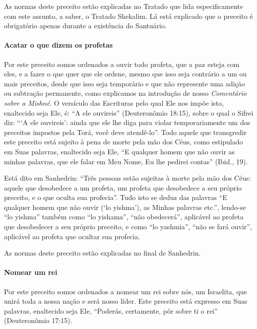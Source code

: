 As normas deste preceito estão explicadas no Tratado que lida
especificamente com este assunto, a saber, o Tratado Shekalim. Lá está
explicado que o preceito é obrigatório apenas durante a existência do
Santuário.

\paragraph{Acatar o que dizem os profetas}

Por este preceito somos ordenados a ouvir todo profeta, que a paz esteja
com eles, e a fazer o que quer que ele ordene, mesmo que isso seja contrário a um ou mais preceitos, desde que isso seja temporário e que não
represente uma adição ou subtração permanente, como explicamos na
introdução de nosso \emph{Comentário sobre a Mishné}. O versículo das
Escrituras pelo qual Ele nos impõe isto, enaltecido seja Ele, é: ``A ele
ouvireis'' (Deuteronômio 18:15), sobre o qual o Sifrei diz: ```A ele
ouvireis': ainda que ele lhe diga para violar temporariamente um dos
preceitos impostos pela Torá, você deve atendê-lo''. Todo aquele que
transgredir este preceito está sujeito à pena de morte pela mão dos
Céus, como estipulado em Suas palavras, enaltecido seja Ele, ``E
qualquer homem que não ouvir as minhas palavras, que ele falar em Meu
Nome, Eu lhe pedirei contas'' (Ibid., 19).

Está dito em Sanhedrin: ``Três pessoas estão sujeitas à morte pela mão
dos Céus: aquele que desobedece a um profeta, um profeta que desobedece
a seu próprio preceito, e o que oculta sua profecia''. Tudo isto se
deduz das palavras ``E qualquer homem que não ouvir (`lo yishma'), as
Minhas palavras etc.'', lendo-se ``lo yishma'' também como ``lo
yishama'', ``não obedecerá'', aplicável ao profeta que desobedecer a
seu próprio preceito, e como ``lo yashmia'', ``não se fará ouvir'',
aplicável ao profeta que ocultar sua profecia.

As normas deste preceito estão explicadas no final de Sanhedrin.

\paragraph{Nomear um rei}

Por este preceito somos ordenados a nomear um rei sobre nós, um
Israelita, que unirá toda a nossa nação e será nosso líder. Este
preceito está expresso em Suas palavras, enaltecido seja Ele,
``Poderás, certamente, pôr sobre ti o rei'' (Deuteronômio 17:15).

